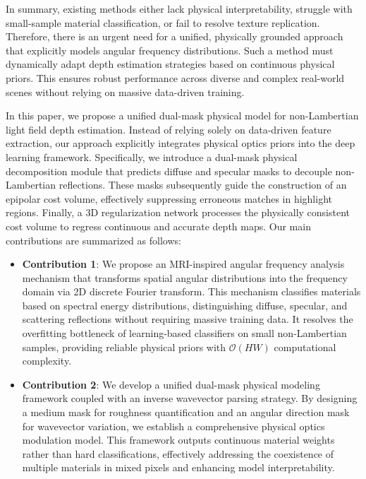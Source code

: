 In summary, existing methods either lack physical interpretability, struggle with small-sample material classification, or fail to resolve texture replication. Therefore, there is an urgent need for a unified, physically grounded approach that explicitly models angular frequency distributions. Such a method must dynamically adapt depth estimation strategies based on continuous physical priors. This ensures robust performance across diverse and complex real-world scenes without relying on massive data-driven training.

In this paper, we propose a unified dual-mask physical model for non-Lambertian light field depth estimation. Instead of relying solely on data-driven feature extraction, our approach explicitly integrates physical optics priors into the deep learning framework. Specifically, we introduce a dual-mask physical decomposition module that predicts diffuse and specular masks to decouple non-Lambertian reflections. These masks subsequently guide the construction of an epipolar cost volume, effectively suppressing erroneous matches in highlight regions. Finally, a 3D regularization network processes the physically consistent cost volume to regress continuous and accurate depth maps. Our main contributions are summarized as follows:

\begin{itemize}\item \textbf{Contribution 1}: We propose an MRI-inspired angular frequency analysis mechanism that transforms spatial angular distributions into the frequency domain via 2D discrete Fourier transform. This mechanism classifies materials based on spectral energy distributions, distinguishing diffuse, specular, and scattering reflections without requiring massive training data. It resolves the overfitting bottleneck of learning-based classifiers on small non-Lambertian samples, providing reliable physical priors with $\mathcal{O}(HW)$ computational complexity.\end{itemize}

\begin{itemize}\item \textbf{Contribution 2}: We develop a unified dual-mask physical modeling framework coupled with an inverse wavevector parsing strategy. By designing a medium mask for roughness quantification and an angular direction mask for wavevector variation, we establish a comprehensive physical optics modulation model. This framework outputs continuous material weights rather than hard classifications, effectively addressing the coexistence of multiple materials in mixed pixels and enhancing model interpretability.\end{itemize}

